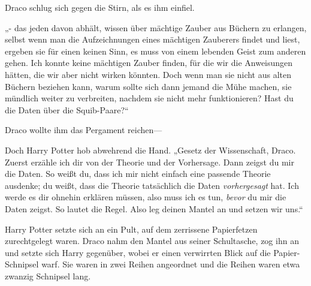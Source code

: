 Draco schlug sich gegen die Stirn, als es ihm einfiel.

„- das jeden davon abhält, wissen über mächtige Zauber aus Büchern zu erlangen, selbst wenn man die Aufzeichnungen eines mächtigen Zauberers findet und liest, ergeben sie für einen keinen Sinn, es muss von einem lebenden Geist zum anderen gehen. Ich konnte keine mächtigen Zauber finden, für die wir die Anweisungen hätten, die wir aber nicht wirken könnten. Doch wenn man sie nicht aus alten Büchern beziehen kann, warum sollte sich dann jemand die Mühe machen, sie mündlich weiter zu verbreiten, nachdem sie nicht mehr funktionieren? Hast du die Daten über die Squib-Paare?“

Draco wollte ihm das Pergament reichen—

Doch Harry Potter hob abwehrend die Hand. „Gesetz der Wissenschaft, Draco. Zuerst erzähle ich dir von der Theorie und der Vorhersage. Dann zeigst du mir die Daten. So weißt du, dass ich mir nicht einfach eine passende Theorie ausdenke; du weißt, dass die Theorie tatsächlich die Daten \emph{vorhergesagt} hat. Ich werde es dir ohnehin erklären müssen, also muss ich es tun, \emph{bevor} du mir die Daten zeigst. So lautet die Regel. Also leg deinen Mantel an und setzen wir uns.“

Harry Potter setzte sich an ein Pult, auf dem zerrissene Papierfetzen zurechtgelegt waren. Draco nahm den Mantel aus seiner Schultasche, zog ihn an und setzte sich Harry gegenüber, wobei er einen verwirrten Blick auf die Papier-Schnipsel warf. Sie waren in zwei Reihen angeordnet und die Reihen waren etwa zwanzig Schnipsel lang.

